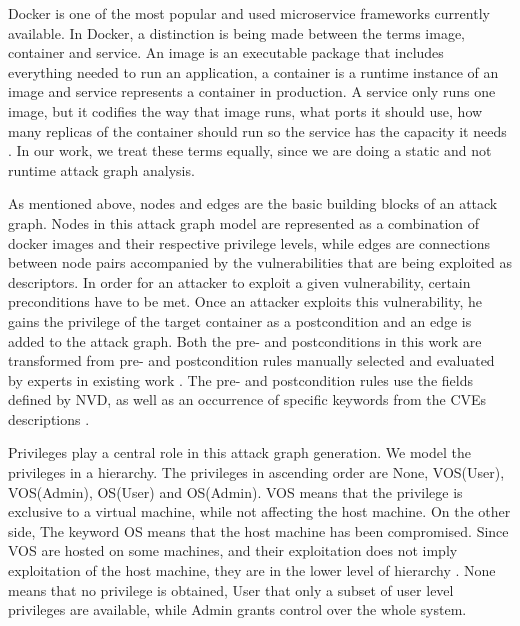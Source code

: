 Docker is one of the most popular and used microservice frameworks currently available. In Docker, a distinction is being made between the terms image, container and service. An image is an executable package that includes everything needed to run an application, a container is a runtime instance of an image and service represents a container in production. A service only runs one image, but it codifies the way that image runs, what ports it should use, how many replicas of the container should run so the service has the capacity it needs  \cite{merkel2014docker}. In our work, we treat these terms equally, since we are doing a static and not runtime attack graph analysis.

As mentioned above, nodes and edges are the basic building blocks of an attack graph. Nodes in this attack graph model are represented as a combination of docker images and their respective privilege levels, while edges are connections between node pairs accompanied by the vulnerabilities that are being exploited as descriptors. In order for an attacker to exploit a given vulnerability, certain preconditions have to be met. Once an attacker exploits this vulnerability, he gains the privilege of the target container as a postcondition and an edge is added to the attack graph. Both the pre- and postconditions in this work are transformed from pre- and postcondition rules manually selected and evaluated by experts in existing work \cite{aksu2018automated}. The pre- and postcondition rules use the fields defined by NVD, as well as an occurrence of specific keywords from the CVEs descriptions \cite{booth2013national}.

Privileges play a central role in this attack graph generation. We model the privileges in a hierarchy. The privileges in ascending order are None, VOS(User), VOS(Admin), OS(User) and OS(Admin). VOS means that the privilege is exclusive to a virtual machine, while not affecting the host machine. On the other side, The keyword OS means that the host machine has been compromised. Since VOS are hosted on some machines, and their exploitation does not imply exploitation of the host machine, they are in the lower level of hierarchy \cite{aksu2018automated}. None means that no privilege is obtained, User that only a subset of user level privileges are available, while Admin grants control over the whole system.

